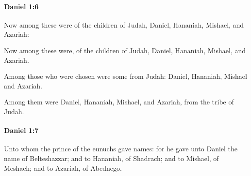 		\paragraph{Daniel 1:6} %
			\label{DANIEL-1-6}

			Now among these were of the children of Judah, Daniel, Hananiah, Mishael, and Azariah:

			\begin{versebox}
					\item[BHS] 
					\item[LXX] 
					\item[ASV] Now among these were, of the children of Judah, Daniel, Hananiah, Mishael, and Azariah.
					\item[NIV] Among those who were chosen were some from Judah: Daniel, Hananiah, Mishael and Azariah.
					\item[NRSV] Among them were Daniel, Hananiah, Mishael, and Azariah, from the tribe of Judah.
			\end{versebox}

		\paragraph{Daniel 1:7} %
			\label{DANIEL-1-7}

			Unto whom the prince of the eunuchs gave names: for he gave unto Daniel the name of Belteshazzar; and to Hananiah, of Shadrach; and to Mishael, of Meshach; and to Azariah, of Abednego.

